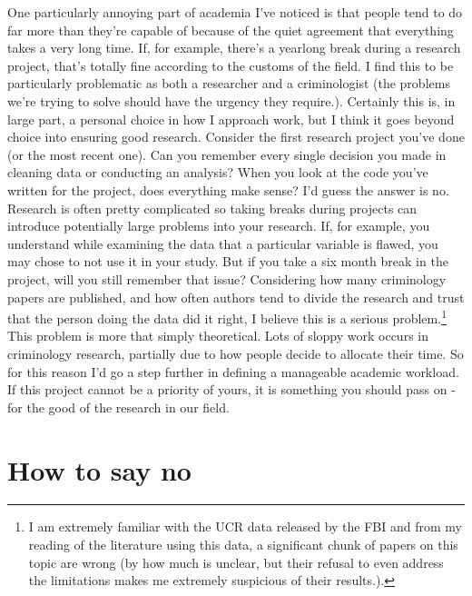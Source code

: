 \documentclass[
  12pt,
  openany]{book}
\begin{document}
One particularly annoying part of academia I've noticed is that people tend to do far more than they're capable of because of the quiet agreement that everything takes a very long time. If, for example, there's a yearlong break during a research project, that's totally fine according to the customs of the field. I find this to be particularly problematic as both a researcher and a criminologist (the problems we're trying to solve should have the urgency they require.). Certainly this is, in large part, a personal choice in how I approach work, but I think it goes beyond choice into ensuring good research. Consider the first research project you've done (or the most recent one). Can you remember every single decision you made in cleaning data or conducting an analysis? When you look at the code you've written for the project, does everything make sense? I'd guess the answer is no. Research is often pretty complicated so taking breaks during projects can introduce potentially large problems into your research. If, for example, you understand while examining the data that a particular variable is flawed, you may chose to not use it in your study. But if you take a six month break in the project, will you still remember that issue? Considering how many criminology papers are published, and how often authors tend to divide the research and trust that the person doing the data did it right, I believe this is a serious problem.\footnote{I am extremely familiar with the UCR data released by the FBI and from my reading of the literature using this data, a significant chunk of papers on this topic are wrong (by how much is unclear, but their refusal to even address the limitations makes me extremely suspicious of their results.).} This problem is more that simply theoretical. Lots of sloppy work occurs in criminology research, partially due to how people decide to allocate their time. So for this reason I'd go a step further in defining a manageable academic workload. If this project cannot be a priority of yours, it is something you should pass on - for the good of the research in our field.

\hypertarget{how-to-say-no}{%
\section{How to say no}\label{how-to-say-no}}
\end{document}
